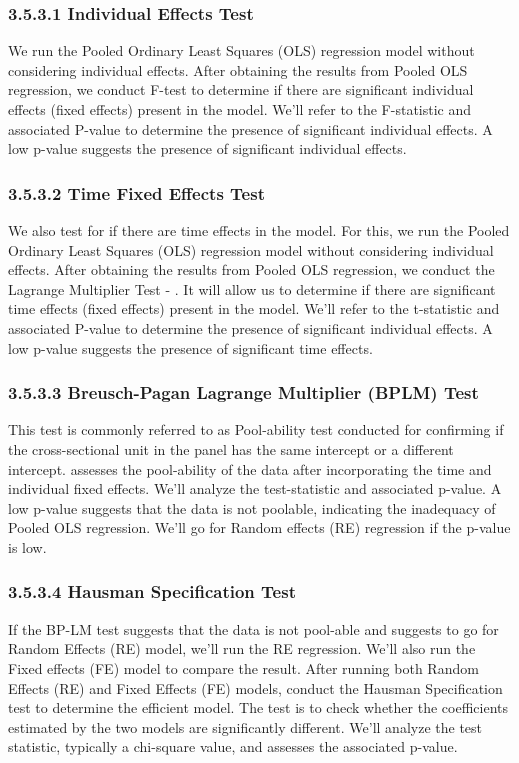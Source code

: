 \documentclass[12pt, a4paper]{article}
\begin{document}
\subsubsection{3.5.3.1 Individual Effects Test}
\renewcommand{\thepage}{\arabic{page}}
We run the Pooled Ordinary Least Squares (OLS) regression model without considering individual effects. After obtaining the results from Pooled OLS regression, we conduct F-test to determine if there are significant individual effects (fixed effects) present in the model. We'll refer to the F-statistic and associated P-value to determine the presence of significant individual effects.  A low p-value suggests the presence of significant individual effects.

\subsubsection{3.5.3.2 Time Fixed Effects Test}
\renewcommand{\thepage}{\arabic{page}}
We also test for if there are time effects in the model. For this, we run the Pooled Ordinary Least Squares (OLS) regression model without considering individual effects. After obtaining the results from Pooled OLS regression, we conduct the Lagrange Multiplier Test - \cite{honda1988size}. It will allow us to determine if there are significant time effects (fixed effects) present in the model. We'll refer to the t-statistic and associated P-value to determine the presence of significant individual effects.  A low p-value suggests the presence of significant time effects.

\subsubsection{3.5.3.3 Breusch-Pagan Lagrange Multiplier (BPLM) Test}
\renewcommand{\thepage}{\arabic{page}}
This test is commonly referred to as Pool-ability test conducted for confirming if the cross-sectional unit in the panel has the same intercept or a different intercept. \cite{breusch1980lagrange} assesses the pool-ability of the data after incorporating the time and individual fixed effects. We'll analyze the test-statistic and associated p-value. A low p-value suggests that the data is not poolable, indicating the inadequacy of Pooled OLS regression. We'll go for Random effects (RE) regression if the p-value is low.

\subsubsection{3.5.3.4 Hausman Specification Test}
If the BP-LM test suggests that the data is not pool-able and suggests to go for Random Effects (RE) model, we'll run the RE regression. We'll also run the Fixed effects (FE) model to compare the result. After running both Random Effects (RE) and Fixed Effects (FE) models, conduct the Hausman Specification test \cite{hausman1978specification} to determine the efficient model. The test is to check whether the coefficients estimated by the two models are significantly different. We'll analyze the test statistic, typically a chi-square value, and assesses the associated p-value.  
 
\end{document}
